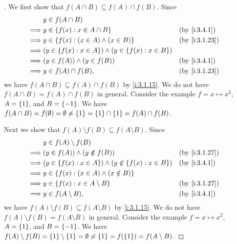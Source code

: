 \begin{proof}[]
  We first show that \(f(A \cap B) \subseteq f(A) \cap f(B)\).
  Since
  \begin{align*}
             & y \in f(A \cap B)                                                                        \\
    \implies & y \in \set{f(x) : x \in A \cap B}                                     &  & \by{i:3.4.1}  \\
    \implies & y \in \set{f(x) : (x \in A) \land (x \in B)}                          &  & \by{i:3.1.23} \\
    \implies & \pa{y \in \set{f(x) : x \in A}} \land \pa{y \in \set{f(x) : x \in B}}                    \\
    \implies & (y \in f(A)) \land (y \in f(B))                                       &  & \by{i:3.4.1}  \\
    \implies & y \in f(A) \cap f(B),                                                 &  & \by{i:3.1.23}
  \end{align*}
  we have \(f(A \cap B) \subseteq f(A) \cap f(B)\) by \cref{i:3.1.15}.
  We do not have \(f(A \cap B) = f(A) \cap f(B)\) in general.
  Consider the example \(f = x \mapsto x^2\), \(A = \left\lbrace1\right\rbrace\), and \(B = \left\lbrace-1\right\rbrace\).
  We have \(f(A \cap B) = f(\emptyset) = \emptyset \neq \left\lbrace1\right\rbrace = \left\lbrace1\right\rbrace \cap \left\lbrace1\right\rbrace = f(A) \cap f(B)\).

  Next we show that \(f(A) \setminus f(B) \subseteq f(A \setminus B)\).
  Since
  \begin{align*}
             & y \in f(A) \setminus f(B)                                                                   \\
    \implies & (y \in f(A)) \land (y \notin f(B))                                       &  & \by{i:3.1.27} \\
    \implies & \pa{y \in \set{f(x) : x \in A}} \land \pa{y \notin \set{f(x) : x \in B}} &  & \by{i:3.4.1}  \\
    \implies & y \in \set{f(x) : (x \in A) \land (x \notin B)}                                             \\
    \implies & y \in \set{f(x) : x \in A \setminus B}                                   &  & \by{i:3.1.27} \\
    \implies & y \in f(A \setminus B),                                                  &  & \by{i:3.4.1}
  \end{align*}
  we have \(f(A) \setminus f(B) \subseteq f(A \setminus B)\) by \cref{i:3.1.15}.
  We do not have \(f(A) \setminus f(B) = f(A \setminus B)\) in general.
  Consider the example \(f = x \mapsto x^2\), \(A = \left\lbrace1\right\rbrace\), and \(B = \left\lbrace-1\right\rbrace\).
  We have \(f(A) \setminus f(B) = \left\lbrace1\right\rbrace \setminus \left\lbrace1\right\rbrace = \emptyset \neq \left\lbrace1\right\rbrace = f(\left\lbrace1\right\rbrace) = f(A \setminus B)\).


\end{proof}
